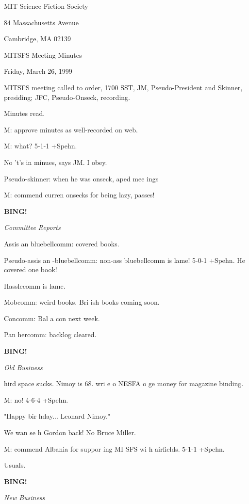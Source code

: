 \documentclass[12pt]{article}
\newcommand{\bing}{{\bf BING!} }
\newcommand{\goto}[1]{\bing \vskip 12pt \centerline{{\em{#1}}}}
\begin{document}
\begin{center}

MIT Science Fiction Society 

84 Massachusetts Avenue

Cambridge, MA 02139

\vspace{12pt}

MITSFS Meeting Minutes 

Friday, March 26, 1999

\end{center}
 
\vspace{18pt}

\setlength{\parskip}{6pt}

\noindent
MITSFS meeting called to order, 1700 SST,
JM, Pseudo-President and Skinner, presiding; JFC, Pseudo-Onseck, recording.

Minutes read.

M: approve minutes as well-recorded on web.

M: what? 5-1-1 +Spehn.

No 't's in minues, says JM. I obey.

Pseudo-skinner: when he was onseck, aped mee ings

M: commend curren onsecks for being lazy, passes!

\goto{Committee Reports}

Assis an bluebellcomm: covered books.

Pseudo-assis an -bluebellcomm: non-ass bluebellcomm is lame! 5-0-1 +Spehn. He covered one book!

Hasslecomm is lame.

Mobcomm: weird books. Bri ish books coming soon.

Concomm: Bal a con next week.

Pan hercomm: backlog cleared.

\goto{Old Business}

 hird space sucks. Nimoy is 68. wri e  o NESFA  o ge  money for magazine binding.

M: no! 4-6-4 +Spehn.

"Happy bir hday... Leonard Nimoy."

We wan  se  h  Gordon back! No Bruce Miller.

M: commend Albania for suppor ing MI SFS wi h airfields. 5-1-1 +Spehn.

Usuals.

\goto{New Business}
\end{document}
